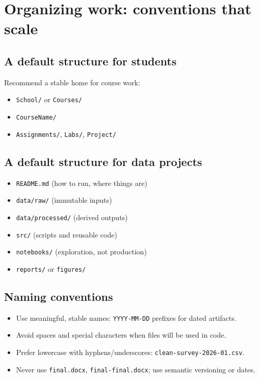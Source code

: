 \section{Organizing work: conventions that scale}
\subsection{A default structure for students}
Recommend a stable home for course work:
\begin{itemize}
\item \texttt{School/} or \texttt{Courses/}
\item \texttt{CourseName/}
\item \texttt{Assignments/}, \texttt{Labs/}, \texttt{Project/}
\end{itemize}

\subsection{A default structure for data projects}
\begin{itemize}
\item \texttt{README.md} (how to run, where things are)
\item \texttt{data/raw/} (immutable inputs)
\item \texttt{data/processed/} (derived outputs)
\item \texttt{src/} (scripts and reusable code)
\item \texttt{notebooks/} (exploration, not production)
\item \texttt{reports/} or \texttt{figures/}
\end{itemize}

\subsection{Naming conventions}
\begin{itemize}
\item Use meaningful, stable names: \texttt{YYYY-MM-DD} prefixes for dated artifacts.
\item Avoid spaces and special characters when files will be used in code.
\item Prefer lowercase with hyphens/underscores: \texttt{clean-survey-2026-01.csv}.
\item Never use \texttt{final.docx}, \texttt{final-final.docx}; use semantic versioning or dates.
\end{itemize}

